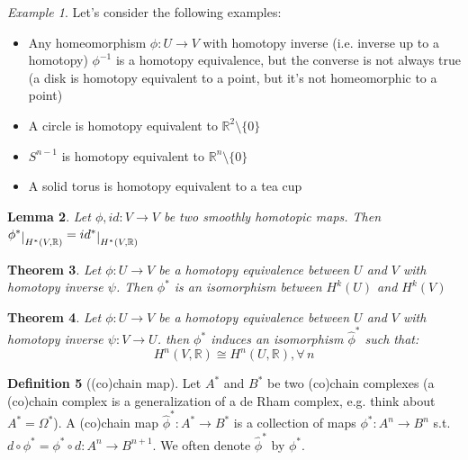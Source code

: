 \documentclass[a4paper,11pt,titlepage]{article}
\numberwithin{equation}{section}
\newtheorem{theorem}{Theorem}[section]
\newtheorem{lemma}[theorem]{Lemma}
\theoremstyle{definition}
\newtheorem{definition}[theorem]{Definition}
\theoremstyle{remark}
\newtheorem{example}[theorem]{Example}
\newcommand{\rfield}{\mathbb{R}}
\newcommand{\restrict}[2]{{#1}\raisebox{-.5ex}{$|$}_{#2}}
\begin{document}
 \begin{example}
   Let's consider the following examples:
   \begin{itemize}
     \item Any homeomorphism $\phi \colon U \rightarrow V$ with homotopy inverse (i.e. inverse up to a homotopy) $\phi^{-1}$ is a homotopy equivalence, but the converse is not always true (a disk is homotopy equivalent to a point, but it's not homeomorphic to a point)
     \item A circle is homotopy equivalent to $\rfield^2 \setminus \{0\}$
     \item $S^{n-1}$ is homotopy equivalent to $\rfield^n \setminus \{0\}$
     \item A solid torus is homotopy equivalent to a tea cup
   \end{itemize}
 \end{example}

 \begin{lemma}
   Let $\phi, id \colon V \rightarrow V$ be two smoothly homotopic maps. Then $\restrict{\phi^*}{H^*(V, \rfield)} = \restrict{id^*}{H^*(V, \rfield)}$
 \end{lemma}

 \begin{theorem}
   Let $\phi \colon U \rightarrow V$ be a homotopy equivalence between $U$ and $V$ with homotopy inverse $\psi$. Then $\phi^*$ is an isomorphism between $H^k(U)$ and $H^k(V)$
 \end{theorem}

\begin{theorem}
  Let $\phi \colon U \rightarrow V$ be a homotopy equivalence between $U$ and $V$ with homotopy inverse $\psi \colon V \rightarrow U$. then $\phi^*$ induces an isomorphism $\hat \phi^*$ such that:
  \begin{equation}
    H^n(V, \rfield) \cong H^n(U, \rfield), \forall\, n
  \end{equation}
\end{theorem}

\begin{definition}[(co)chain map] %
  Let $A^*$ and $B^*$ be two (co)chain complexes (a (co)chain complex is a generalization of a de Rham complex, e.g. think about $A^*=\Omega^*$).
  A (co)chain map $\hat \phi^* \colon A^* \rightarrow B^*$ is a collection of maps $\phi^* \colon A^n \rightarrow B^n$ s.t. $d \circ \phi^* = \phi^* \circ d \colon A^n \rightarrow B^{n+1}$. We often denote $\hat \phi^*$ by $\phi^*$.
\end{definition}
\end{document}

